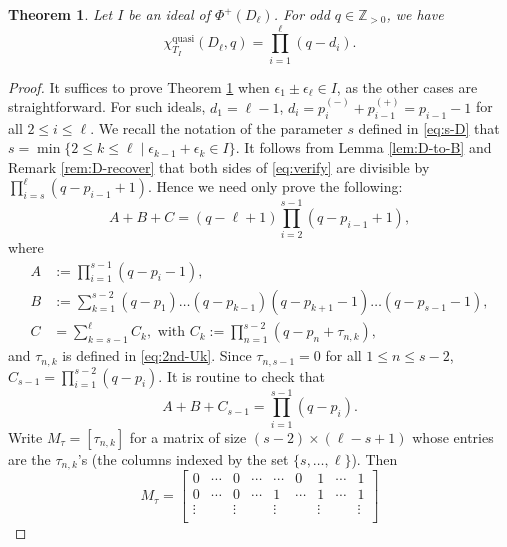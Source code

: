 \documentclass[12pt]{amsart}
\theoremstyle{plain}
\newtheorem{theorem}{Theorem}[section]
\theoremstyle{definition}
\theoremstyle{remark}
\newcommand{\Z}{\mathbb{Z}}
\newcommand{\quasi}{\operatorname{quasi}}
\begin{document}
\begin{theorem}
\label{thm:verify}
Let $I$ be an ideal of $\Phi^+(D_\ell)$. For odd $q \in \Z_{>0}$, we have
  \begin{equation}
  \label{eq:verify}
\chi^{\quasi}_{T_{I}}(D_\ell, q)= \prod_{i=1}^{\ell}\left(q- d_i  \right).
   \end{equation}
\end{theorem}
 \begin{proof} 
It suffices to prove Theorem \ref{thm:verify} when $\epsilon_1\pm\epsilon_{\ell}  \in I$, as the other cases are straightforward.  
For such ideals, $d_1=\ell-1$, $d_i=p_i^{(-)}+p_{i-1}^{(+)}=p_{i-1}-1$ for all  $2 \le i \le \ell$. 
We recall the notation of the parameter $s$ defined in \eqref{eq:s-D} that $s =\min \{ 2 \le k \le \ell \mid \epsilon_{k-1}+\epsilon_k  \in I\}$. 
It follows from Lemma \ref{lem:D-to-B} and Remark \ref{rem:D-recover} that both sides of \eqref{eq:verify} are divisible by $\prod_{i=s}^{\ell}\left(q- p_{i-1}+1 \right)$. 
Hence we need only prove the following:
  \begin{equation}
  \label{eq:verify-need}
  A+B+C=(q-\ell+1)\prod_{i=2}^{s-1}\left(q- p_{i-1}+1\right),
     \end{equation}
where
\begin{align*}
A & := \prod_{i=1}^{s-1}\left(q- p_i-1 \right), \\
B & :=  \sum_{k=1}^{s-2}(q-p_1)\ldots(q-p_{k-1})(q-p_{k+1}-1)\ldots(q-p_{s-1}-1), \\
C & = \sum_{k=s-1}^{\ell}C_k, \mbox{ with } C_k:= \prod_{n=1}^{s-2}\left(q- p_n+\tau_{n,k} \right),
\end{align*}
and $\tau_{n,k}$ is defined in  \eqref{eq:2nd-Uk}. 
Since $\tau_{n,s-1}=0$ for all $1 \le n \le s-2$, $C_{s-1}=\prod_{i=1}^{s-2}\left(q- p_i\right)$. 
It is routine to check that
  \begin{equation}
  \label{eq:verify-routine}
  A+B+C_{s-1}=\prod_{i=1}^{s-1}\left(q- p_i \right).
       \end{equation}
Write $M_\tau=[\tau_{n,k}]$ for a matrix of size $(s-2) \times (\ell-s+1)$ whose entries are the $\tau_{n,k}$'s (the columns indexed by the set $\{s,\ldots,\ell\}$).
Then
$$
M_\tau =
\begin{bmatrix}
0 & \cdots & 0  & \cdots  &\cdots  & 0  & 1 & \cdots  & 1  \\
0 & \cdots & 0  & \cdots  &1 & \cdots   & 1 & \cdots  & 1  \\
\vdots  &  & \vdots  & & \vdots  &    & \vdots  &   & \vdots   \\

\end{bmatrix}$$
\end{proof}
\end{document}
